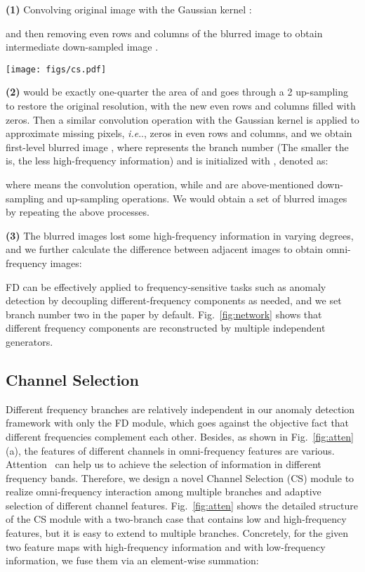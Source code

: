 \documentclass[lettersize,journal]{IEEEtran}
\makeatletter
\DeclareRobustCommand\onedot{\futurelet\@let@token\@onedot}
\def\@onedot{\ifx\@let@token.\else.\null\fi\xspace}
\def\ie{\emph{i.e}\onedot} \def\Ie{\emph{I.e}\onedot}
\makeatother
\begin{document}
\noindent\textbf{(1)} Convolving original image  with the Gaussian kernel :


and then removing even rows and columns of the blurred image to obtain intermediate down-sampled image .
\begin{figure*}[t]
    \centering
    \texttt{[image: figs/cs.pdf]}
    \caption{\textbf{(a) Schematic diagram of CS}. For simplicity, a two-branch case is shown here that  and  represent low-/high-frequency features, \ie, features in branch one and two. Augmented  and  are fed into following layers. \textbf{(b) Integration of CS to the framework}. The CS module is used at each stage of encoding.}
    \label{fig:atten}
\end{figure*}

\noindent\textbf{(2)}  would be exactly one-quarter the area of  and goes through a 2 up-sampling to restore the original resolution, with the new even rows and columns filled with zeros. Then a similar convolution operation with the Gaussian kernel  is applied to approximate missing pixels, \ie, zeros in even rows and columns, and we obtain first-level blurred image , where  represents the branch number (The smaller the  is, the less high-frequency information) and  is initialized with , denoted as:


where  means the convolution operation, while  and  are above-mentioned down-sampling and up-sampling operations. We would obtain a set of blurred images  by repeating the above processes. 

\noindent\textbf{(3)} The blurred images  lost some high-frequency information in varying degrees, and we further calculate the difference between adjacent images to obtain omni-frequency images:


FD can be effectively applied to frequency-sensitive tasks such as anomaly detection by decoupling different-frequency components as needed, and we set branch number two in the paper by default. Fig.~\ref{fig:network} shows that different frequency components are reconstructed by multiple independent generators.


\subsection{Channel Selection}
Different frequency branches are relatively independent in our anomaly detection framework with only the FD module, which goes against the objective fact that different frequencies complement each other. Besides, as shown in Fig.~\ref{fig:atten} (a), the features of different channels in omni-frequency features are various. Attention~\cite{li2019selective} can help us to achieve the selection of information in different frequency bands. Therefore, we design a novel Channel Selection (CS) module to realize omni-frequency interaction among multiple branches and adaptive selection of different channel features. Fig.~\ref{fig:atten} shows the detailed structure of the CS module with a two-branch case that contains low and high-frequency features, but it is easy to extend to multiple branches. Concretely, for the given two feature maps  with high-frequency information and  with low-frequency information, we fuse them via an element-wise summation:
\end{document}
